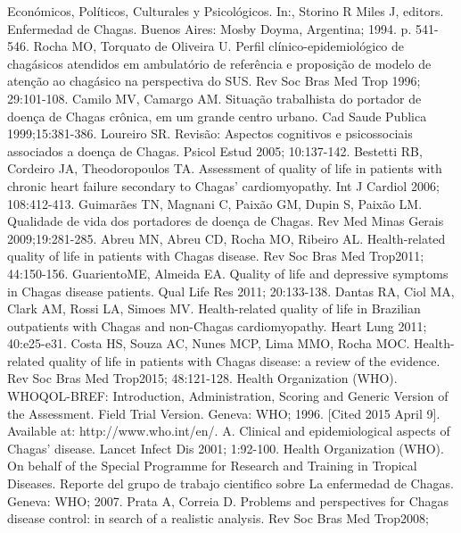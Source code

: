 \begin{biblio}[References]
 Económicos, Políticos, Culturales y
 Psicológicos. In:, Storino R Miles J, editors. Enfermedad de Chagas. Buenos Aires:
 Mosby Doyma, Argentina; 1994. p. 541-546.
 Rocha MO, Torquato de Oliveira U. Perfil
 clínico-epidemiológico de chagásicos atendidos em ambulatório de referência e
 proposição de modelo de atenção ao chagásico na perspectiva do SUS. Rev Soc Bras Med
 Trop 1996; 29:101-108.
 Camilo MV, Camargo AM. Situação trabalhista do portador de
 doença de Chagas crônica, em um grande centro urbano. Cad Saude Publica
 1999;15:381-386.
 Loureiro SR. Revisão: Aspectos cognitivos e psicossociais
 associados a doença de Chagas. Psicol Estud 2005; 10:137-142.
 Bestetti RB, Cordeiro JA, Theodoropoulos TA. Assessment of
 quality of life in patients with chronic heart failure secondary to Chagas'
 cardiomyopathy. Int J Cardiol 2006; 108:412-413.
 Guimarães TN, Magnani C, Paixão GM, Dupin S, Paixão LM.
 Qualidade de vida dos portadores de doença de Chagas. Rev Med Minas Gerais
 2009;19:281-285.
 Abreu MN, Abreu CD, Rocha MO, Ribeiro AL. Health-related
 quality of life in patients with Chagas disease. Rev Soc Bras Med Trop2011;
 44:150-156.
 GuarientoME, Almeida EA. Quality of life and depressive
 symptoms in Chagas disease patients. Qual Life Res 2011; 20:133-138.
 Dantas RA, Ciol MA, Clark AM, Rossi LA, Simoes MV.
 Health-related quality of life in Brazilian outpatients with Chagas and non-Chagas
 cardiomyopathy. Heart Lung 2011; 40:e25-e31.
 Costa HS, Souza AC, Nunes MCP, Lima MMO, Rocha MOC.
 Health-related quality of life in patients with Chagas disease: a review of the
 evidence. Rev Soc Bras Med Trop2015; 48:121-128.
Health Organization (WHO). WHOQOL-BREF: Introduction,
 Administration, Scoring and Generic Version of the Assessment. Field Trial Version.
 Geneva: WHO; 1996. [Cited 2015 April 9]. Available at:
 http://www.who.int/en/.
A. Clinical and epidemiological aspects of Chagas' disease. Lancet
 Infect Dis 2001; 1:92-100.
Health Organization (WHO). On behalf of the Special Programme for
 Research and Training in Tropical Diseases. Reporte del grupo de trabajo cientifico
 sobre La enfermedad de Chagas. Geneva: WHO; 2007.
 Prata A, Correia D. Problems and perspectives for Chagas
 disease control: in search of a realistic analysis. Rev Soc Bras Med Trop2008;

\end{biblio}
